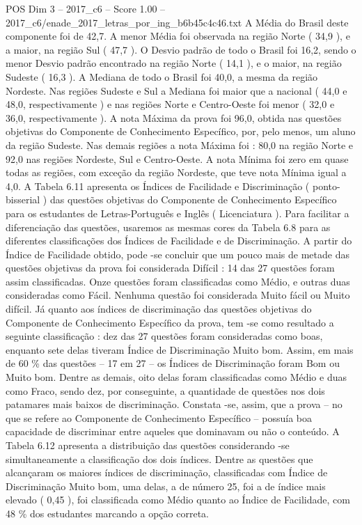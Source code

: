 \begin{textsample}{POS Dim 3 – 2017\_c6 – Score 1.00 – 2017\_c6/enade\_2017\_letras\_por\_ing\_b6b45c4c46.txt}
A Média do Brasil deste componente foi de 42,7.
A menor Média foi observada na região Norte ( 34,9 ), e a maior, na região Sul ( 47,7 ).
O Desvio padrão de todo o Brasil foi 16,2, sendo o menor Desvio padrão encontrado na região Norte ( 14,1 ), e o maior, na região Sudeste ( 16,3 ).
A Mediana de todo o Brasil foi 40,0, a mesma da região Nordeste.
Nas regiões Sudeste e Sul a Mediana foi maior que a nacional ( 44,0 e 48,0, respectivamente ) e nas regiões Norte e Centro-Oeste foi menor ( 32,0 e 36,0, respectivamente ).
A nota Máxima da prova foi 96,0, obtida nas questões objetivas do Componente de Conhecimento Específico, por, pelo menos, um aluno da região Sudeste.
Nas demais regiões a nota Máxima foi : 80,0 na região Norte e 92,0 nas regiões Nordeste, Sul e Centro-Oeste.
A nota Mínima foi zero em quase todas as regiões, com exceção da região Nordeste, que teve nota Mínima igual a 4,0.
A Tabela 6.11 apresenta os Índices de Facilidade e Discriminação ( ponto-bisserial ) das questões objetivas do Componente de Conhecimento Específico para os estudantes de Letras-Português e Inglês ( Licenciatura ).
Para facilitar a diferenciação das questões, usaremos as mesmas cores da Tabela 6.8 para as diferentes classificações dos Índices de Facilidade e de Discriminação.
A partir do Índice de Facilidade obtido, pode -se concluir que um pouco mais de metade das questões objetivas da prova foi considerada Difícil : 14 das 27 questões foram assim classificadas.
Onze questões foram classificadas como Médio, e outras duas consideradas como Fácil.
Nenhuma questão foi considerada Muito fácil ou Muito difícil.
Já quanto aos índices de discriminação das questões objetivas do Componente de Conhecimento Específico da prova, tem -se como resultado a seguinte classificação : dez das 27 questões foram consideradas como boas, enquanto sete delas tiveram Índice de Discriminação Muito bom.
Assim, em mais de 60 \% das questões – 17 em 27 – os Índices de Discriminação foram Bom ou Muito bom.
Dentre as demais, oito delas foram classificadas como Médio e duas como Fraco, sendo dez, por conseguinte, a quantidade de questões nos dois patamares mais baixos de discriminação.
Constata -se, assim, que a prova – no que se refere ao Componente de Conhecimento Específico – possuía boa capacidade de discriminar entre aqueles que dominavam ou não o conteúdo.
A Tabela 6.12 apresenta a distribuição das questões considerando -se simultaneamente a classificação dos dois índices.
Dentre as questões que alcançaram os maiores índices de discriminação, classificadas com Índice de Discriminação Muito bom, uma delas, a de número 25, foi a de índice mais elevado ( 0,45 ), foi classificada como Médio quanto ao Índice de Facilidade, com 48 \% dos estudantes marcando a opção correta.

\end{textsample}
